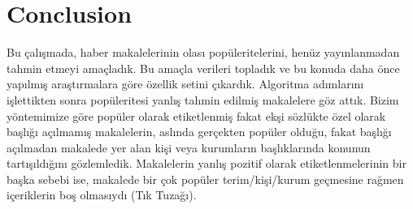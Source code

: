 \documentclass[conference]{IEEEtran}
\begin{document}

\section{Conclusion}
Bu çalışmada, haber makalelerinin olası popüleritelerini, henüz yayınlanmadan tahmin etmeyi amaçladık. Bu amaçla verileri topladık ve bu konuda daha önce yapılmış araştırmalara göre özellik setini çıkardık. Algoritma adımlarını işlettikten sonra popüleritesi yanlış tahmin edilmiş makalelere göz attık. Bizim yöntemimize göre popüler olarak etiketlenmiş fakat ekşi sözlükte özel olarak başlığı açılmamış makalelerin, aslında gerçekten popüler olduğu, fakat başlığı açılmadan makalede yer alan kişi veya kurumların başlıklarında konunun tartışıldığını gözlemledik. Makalelerin yanlış pozitif olarak etiketlenmelerinin bir başka sebebi ise, makalede bir çok popüler terim/kişi/kurum geçmesine rağmen içeriklerin boş olmasıydı (Tık Tuzağı).

%
%




%
%
\end{document}
